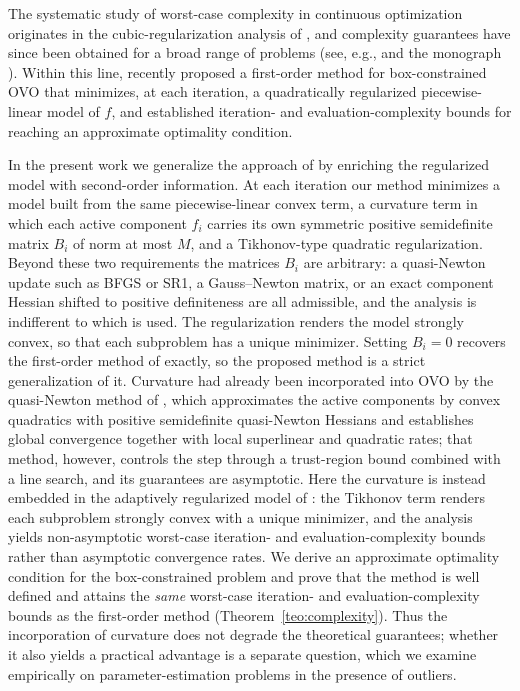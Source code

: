 \documentclass[11pt]{article}
\begin{document}
The systematic study of worst-case complexity in continuous optimization
originates in the cubic-regularization analysis of \cite{nesterov}, and
complexity guarantees have since been obtained for a broad range of problems
(see, e.g., \cite{bgmst2,bgmst1} and the monograph \cite{cogtbook}). Within
this line, \cite{alvarezovo} recently proposed a first-order method for
box-constrained OVO that minimizes, at each iteration, a quadratically
regularized piecewise-linear model of $f$, and established iteration- and
evaluation-complexity bounds for reaching an approximate optimality condition.

In the present work we generalize the approach of \cite{alvarezovo} by
enriching the regularized model with second-order information. At each
iteration our method minimizes a model built from the same piecewise-linear
convex term, a curvature term in which each active component $f_i$ carries its
own symmetric positive semidefinite matrix $B_i$ of norm at most $M$, and a
Tikhonov-type quadratic regularization. Beyond these two requirements the
matrices $B_i$ are arbitrary: a quasi-Newton update such as BFGS or SR1, a
Gauss--Newton matrix, or an exact component Hessian shifted to positive
definiteness are all admissible, and the analysis is indifferent to which is
used. The regularization renders the model strongly convex, so that each
subproblem has a unique minimizer. Setting $B_i=0$ recovers the
first-order method of \cite{alvarezovo} exactly, so the proposed method is a
strict generalization of it. Curvature had already been incorporated into OVO
by the quasi-Newton method of \cite{yano1}, which approximates the active
components by convex quadratics with positive semidefinite quasi-Newton
Hessians and establishes global convergence together with local superlinear
and quadratic rates; that method, however, controls the step through a
trust-region bound combined with a line search, and its guarantees are
asymptotic. Here the curvature is instead embedded in the adaptively
regularized model of \cite{alvarezovo}: the Tikhonov term renders each
subproblem strongly convex with a unique minimizer, and the analysis yields
non-asymptotic worst-case iteration- and evaluation-complexity bounds rather
than asymptotic convergence rates. We derive an approximate optimality
condition for
the box-constrained problem and prove that the method is well defined and
attains the \emph{same} worst-case iteration- and evaluation-complexity bounds
as the first-order method (Theorem~\ref{teo:complexity}). Thus the incorporation of curvature does not degrade
the theoretical guarantees; whether it also yields a practical advantage is a
separate question, which we examine empirically on parameter-estimation
problems in the presence of outliers.
\end{document}
